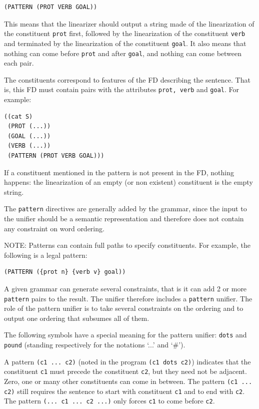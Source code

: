 \documentclass[10pt,a4paper]{report}
\begin{document}
\begin{lstlisting}
(PATTERN (PROT VERB GOAL))
\end{lstlisting}

This means that the linearizer should output a string made of the
linearization of the constituent {\tt prot} first, followed by the
linearization of the constituent {\tt verb} and terminated by the
linearization of the constituent {\tt goal}.  It also means that nothing can
come before {\tt prot} and after {\tt goal}, and nothing can come between each
pair.

The constituents correspond to features of the FD describing the
sentence.  That is, this FD must contain pairs with the
attributes {\tt prot, verb} and {\tt goal}.  For example:

\begin{lstlisting}[language=Lisp]
((cat S)
 (PROT (...))
 (GOAL (...))
 (VERB (...))
 (PATTERN (PROT VERB GOAL)))
\end{lstlisting}

If a constituent mentioned in the pattern is not present in the FD, nothing
happens:  the linearization of an empty (or non existent) constituent is
the empty string.  

The {\tt pattern} directives are generally added by the grammar, since the input
to the unifier should be a semantic representation and therefore does not
contain any constraint on word ordering. 

NOTE: Patterns can contain full paths to specify constituents. For example,
the following is a legal pattern:
\begin{lstlisting}
(PATTERN ({prot n} {verb v} goal))
\end{lstlisting}

A given grammar can generate several constraints, that is it can add 2 or
more {\tt pattern} pairs to the result. The unifier therefore includes a 
{\tt pattern} unifier. The role of the pattern unifier is to take several 
constraints on the ordering and to output one ordering that subsumes all
of them. 

The following symbols have a special meaning for the pattern
unifier: {\tt dots} and {\tt pound} (standing respectively for the
notations `...' and `\#').

A pattern {\tt (c1 ... c2)} (noted in the program {\tt (c1 dots c2)})
indicates that the constituent {\tt c1} must precede the
constituent {\tt c2}, but they need not be adjacent. Zero, one or
many other constituents can come in between.  The pattern {\tt (c1
... c2)} still requires the sentence to start with constituent
{\tt c1} and to end with {\tt c2}. The pattern {\tt (... c1 ... c2 ...)}
only forces {\tt c1} to come before {\tt c2}.
\end{document}
